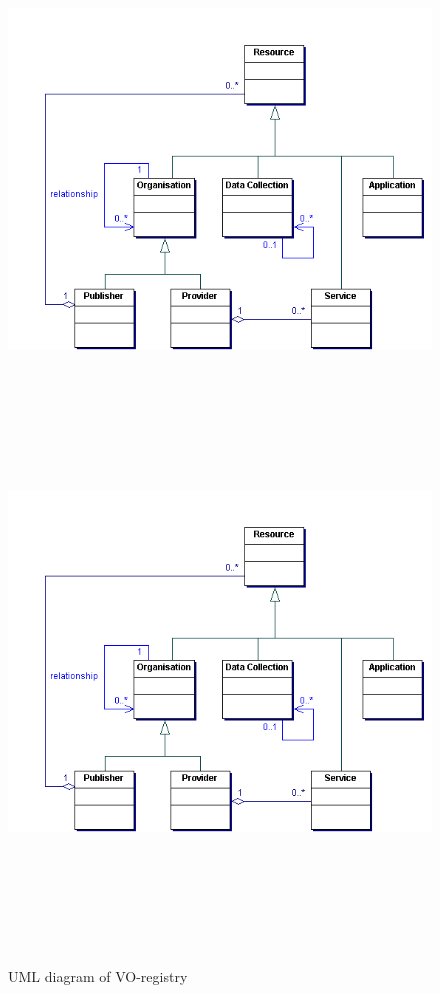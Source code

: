     \begin{figure}[!htbp]
      \begin{center}
        \leavevmode
        \ifpdf
        \includegraphics[height=10cm]{resource}
        \else
        \includegraphics[bb = 92 86 545 742, height=6in]{resource}
        \fi
        \caption{UML diagram of VO-registry}
        \label{FigAir}
      \end{center}
    \end{figure}



